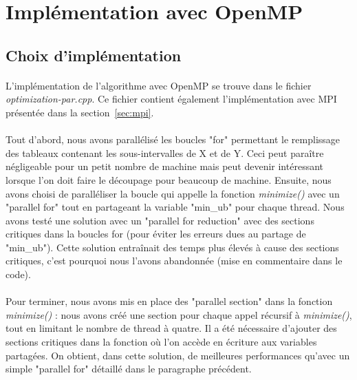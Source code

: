 \section{Implémentation avec OpenMP}

\subsection{Choix d'implémentation}
    
    \paragraph{}
    L'implémentation de l'algorithme avec OpenMP se trouve dans le fichier \textit{optimization-par.cpp}. Ce fichier contient également l'implémentation avec MPI présentée dans la section~\ref{sec:mpi}.
    
    \paragraph{}
    Tout d'abord, nous avons parallélisé les boucles "for" permettant le remplissage des tableaux contenant les sous-intervalles de X et de Y. Ceci peut paraître négligeable pour un petit nombre de machine mais peut devenir intéressant lorsque l'on doit faire le découpage pour beaucoup de machine. Ensuite, nous avons choisi de paralléliser la boucle qui appelle la fonction \textit{minimize()} avec un "parallel for" tout en partageant la variable "min\_ub" pour chaque thread. Nous avons testé une solution avec un "parallel for reduction" avec des sections critiques dans la boucles for (pour éviter les erreurs dues au partage de "min\_ub"). Cette solution entraînait des temps plus élevés à cause des sections critiques, c'est pourquoi nous l'avons abandonnée (mise en commentaire dans le code).
    
    \paragraph{}
    Pour terminer, nous avons mis en place des "parallel section" dans la fonction \textit{minimize()} : nous avons créé une section pour chaque appel récursif à \textit{minimize()}, tout en limitant le nombre de thread à quatre. Il a été nécessaire d'ajouter des sections critiques dans la fonction où l'on accède en écriture aux variables partagées. On obtient, dans cette solution, de meilleures performances qu'avec un simple "parallel for" détaillé dans le paragraphe précédent.

